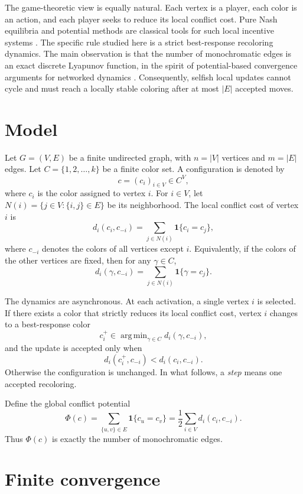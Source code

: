 \documentclass[preprint,12pt]{elsarticle}
\DeclareMathOperator*{\argmin}{arg\,min}
\begin{document}
The game-theoretic view is equally natural. Each vertex is a player, each color
is an action, and each player seeks to reduce its local conflict cost. Pure Nash
equilibria and potential methods are classical tools for such local incentive
systems \cite{nash1951,rosenthal1973,monderer1996}.
The specific rule studied here is a strict best-response recoloring dynamics.
The main observation is that the number of monochromatic edges is an exact
discrete Lyapunov function, in the spirit of potential-based convergence
arguments for networked dynamics \cite{hopfield1982,apt2012}. Consequently,
selfish local updates cannot cycle and must reach a locally stable coloring
after at most $|E|$ accepted moves.

\section{Model}

Let $G=(V,E)$ be a finite undirected graph, with $n=|V|$ vertices and $m=|E|$
edges. Let $C=\{1,2,\ldots,k\}$ be a finite color set. A configuration is
denoted by
\[
    c=(c_i)_{i\in V}\in C^V,
\]
where $c_i$ is the color assigned to vertex $i$. For $i\in V$, let
$N(i)=\{j\in V:\{i,j\}\in E\}$ be its neighborhood. The local conflict cost of
vertex $i$ is
\[
    d_i(c_i,c_{-i})
    =
    \sum_{j\in N(i)} \mathbf{1}\{c_i=c_j\},
\]
where $c_{-i}$ denotes the colors of all vertices except $i$. Equivalently, if
the colors of the other vertices are fixed, then for any $\gamma\in C$,
\[
    d_i(\gamma,c_{-i})
    =
    \sum_{j\in N(i)} \mathbf{1}\{\gamma=c_j\}.
\]

The dynamics are asynchronous. At each activation, a single vertex $i$ is
selected. If there exists a color that strictly reduces its local conflict
cost, vertex $i$ changes to a best-response color
\[
    c_i^+ \in \argmin_{\gamma\in C} d_i(\gamma,c_{-i}),
\]
and the update is accepted only when
\[
    d_i(c_i^+,c_{-i}) < d_i(c_i,c_{-i}).
\]
Otherwise the configuration is unchanged. In what follows, a \emph{step} means
one accepted recoloring.

Define the global conflict potential
\[
    \Phi(c)
    =
    \sum_{\{u,v\}\in E} \mathbf{1}\{c_u=c_v\}
    =
    \frac12 \sum_{i\in V} d_i(c_i,c_{-i}).
\]
Thus $\Phi(c)$ is exactly the number of monochromatic edges.

\section{Finite convergence}
\end{document}
